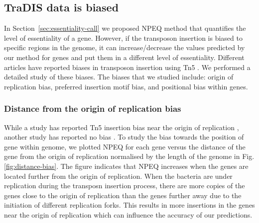 \documentclass[12pt,letterpaper]{article}
\begin{document}
\subsection{TraDIS data is biased}
In Section~\ref{sec:essentiality-call} we proposed NPEQ method that quantifies the level of essentiality of a gene. However, if the transposon insertion is biased to specific regions in the genome, it can increase/decrease the values predicted by our method for genes and put them in a different level of essentiality. Different articles have reported biases in transposon insertion using Tn5 \cite{barquist_comparison_2013, green_insertion_2012, rubin_essential_2015, canals_high-throughput_2012, langridge_simultaneous_2009}. We performed a detailed study of these biases. The biases that we studied include: origin of replication bias, preferred insertion motif bias, and positional bias within genes.
\subsubsection{Distance from the origin of replication bias}
While a study has reported Tn5 insertion bias near the origin of replication \cite{barquist_comparison_2013}, another study has reported no bias \cite{rubin_essential_2015}. To study the bias towards the position of gene within genome, we plotted NPEQ for each gene versus the distance of the gene from the origin of replication normalised by the length of the genome in Fig.\@ \ref{fig:distance-bias}. The figure indicates that NPEQ increases when the genes are located further from the origin of replication. When the bacteria are under replication during the transposn insertion process, there are more copies of the genes close to the origin of replication than the genes further away due to the initiation of different replication forks. This results in more insertions in the genes near the origin of replication which can influence the accuracy of our predictions.
\end{document}
